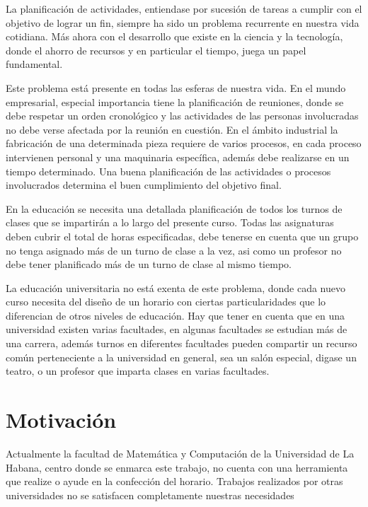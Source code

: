 \begin{introduction}

La planificación de actividades, entiendase por sucesión de tareas a cumplir
con el objetivo de lograr un fin, siempre ha sido un problema recurrente en nuestra
vida cotidiana. Más ahora con el desarrollo que existe en la ciencia y la tecnología,
donde el ahorro de recursos y en particular el tiempo, juega un papel fundamental.

Este problema está presente en todas las esferas de nuestra vida. En el mundo empresarial,
especial importancia tiene la planificación de reuniones, donde se debe respetar un
orden cronológico y las actividades de las personas involucradas no debe verse afectada
por la reunión en cuestión. En el ámbito industrial la fabricación de una determinada
pieza requiere de varios procesos, en cada proceso intervienen personal y una maquinaria
específica, además debe realizarse en un tiempo determinado. Una buena planificación
de las actividades o procesos involucrados determina el buen cumplimiento del objetivo
final.

En la educación se necesita una detallada planificación de todos los turnos de clases que se
impartirán a lo largo del presente curso. Todas las asignaturas deben cubrir el total de horas
especificadas, debe tenerse en cuenta que un grupo no tenga asignado más de un turno de clase
a la vez, asi como un profesor no debe tener planificado más de un turno de clase al mismo tiempo.

La educación universitaria no está exenta de este problema, donde cada nuevo curso necesita del
diseño de un horario con ciertas particularidades que lo diferencian de otros niveles de educación.
Hay que tener en cuenta que en una universidad existen varias facultades, en algunas facultades se
estudian más de una carrera, además turnos en diferentes facultades pueden compartir un recurso común
perteneciente a la universidad en general, sea un salón especial, digase un teatro, o un profesor
que imparta clases en varias facultades.

\section*{Motivación}

Actualmente la facultad de Matemática y Computación de la Universidad de
La Habana, centro donde se enmarca este trabajo, no cuenta con una herramienta
que realize o ayude en la confección del horario. Trabajos realizados por otras
universidades no se satisfacen completamente nuestras necesidades


\end{introduction}
